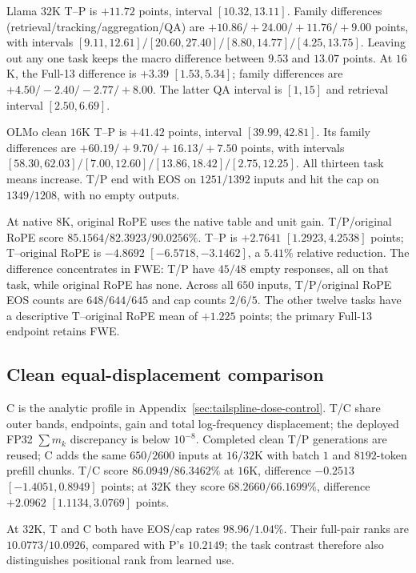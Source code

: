 Llama $32$K T--P is $+11.72$ points, interval $[10.32,13.11]$.
Family differences (retrieval/tracking/aggregation/QA) are
$+10.86/+24.00/+11.76/+9.00$ points, with intervals
$[9.11,12.61]/[20.60,27.40]/[8.80,14.77]/[4.25,13.75]$.
Leaving out any one task keeps the macro difference between $9.53$ and
$13.07$ points. At $16$K, the Full-13 difference is $+3.39$
$[1.53,5.34]$; family differences are $+4.50/-2.40/-2.77/+8.00$.
The latter QA interval is $[1,15]$ and retrieval interval $[2.50,6.69]$.

OLMo clean $16$K T--P is $+41.42$ points, interval $[39.99,42.81]$.
Its family differences are $+60.19/+9.70/+16.13/+7.50$ points, with
intervals $[58.30,62.03]/[7.00,12.60]/[13.86,18.42]/[2.75,12.25]$.
All thirteen task means increase. T/P end with EOS on $1251/1392$
inputs and hit the cap on $1349/1208$, with no empty outputs.

\FloatBarrier
At native $8$K, original RoPE uses the native table and unit gain.
T/P/original RoPE score $85.1564/82.3923/90.0256\%$.
T--P is $+2.7641$ $[1.2923,4.2538]$ points; T--original RoPE is
$-4.8692$ $[-6.5718,-3.1462]$, a $5.41\%$ relative reduction.
The difference concentrates in FWE: T/P have $45/48$ empty responses,
all on that task, while original RoPE has none. Across all $650$ inputs,
T/P/original RoPE EOS counts are $648/644/645$ and cap counts $2/6/5$.
The other twelve tasks have a descriptive T--original RoPE mean of $+1.225$
points; the primary Full-13 endpoint retains FWE.

\subsection{Clean equal-displacement comparison}
\label{sec:clean-shape-new}
C is the analytic profile in Appendix~\ref{sec:tailspline-dose-control}.
T/C share outer bands, endpoints, gain and total log-frequency displacement;
the deployed FP32 $\sum m_k$ discrepancy is below $10^{-8}$. Completed
clean T/P generations are reused; C adds the same $650/2600$ inputs at
$16/32$K with batch $1$ and $8192$-token prefill chunks.
T/C score $86.0949/86.3462\%$ at $16$K, difference $-0.2513$
$[-1.4051,0.8949]$ points; at $32$K they score $68.2660/66.1699\%$,
difference $+2.0962$ $[1.1134,3.0769]$ points.



At $32$K, T and C both have EOS/cap rates $98.96/1.04\%$.
Their full-pair ranks are $10.0773/10.0926$, compared with P's $10.2149$;
the task contrast therefore also distinguishes positional rank from learned use.

